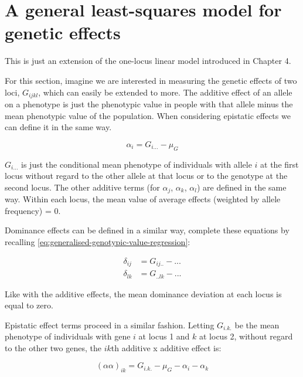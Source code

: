 \documentclass[
]{book}
\begin{document}
\hypertarget{a-general-least-squares-model-for-genetic-effects}{%
\section{A general least-squares model for genetic effects}\label{a-general-least-squares-model-for-genetic-effects}}

This is just an extension of the one-locus linear model introduced in Chapter 4.

For this section, imagine we are interested in measuring the genetic effects of two loci, \(G_{ijkl}\), which can easily be extended to more. The additive effect of an allele on a phenotype is just the phenotypic value in people with that allele minus the mean phenotypic value of the population. When considering epistatic effects we can define it in the same way.

\begin{equation}
  \alpha_{i} = G_{i...} - \mu_{G}
  \label{eq:additive-effects-i}
\end{equation}

\(G_{i...}\) is just the conditional mean phenotype of individuals with allele \(i\) at the first locus without regard to the other allele at that locus or to the genotype at the second locus. The other additive terms (for \(\alpha_{j}\), \(\alpha_{k}\), \(\alpha_{l}\)) are defined in the same way. Within each locus, the mean value of average effects (weighted by allele frequency) = 0.

Dominance effects can be defined in a similar way, complete these equations by recalling \eqref{eq:generalised-genotypic-value-regression}:

\begin{align}
  \delta_{ij} &= G_{ij..} - ... \label{eq:dom-effects-ij} \\
  \delta_{lk} &= G_{..lk} - ... \label{eq:dom-effects-lk}
\end{align}

Like with the additive effects, the mean dominance deviation at each locus is equal to zero.

Epistatic effect terms proceed in a similar fashion. Letting \(G_{i.k.}\) be the mean phenotype of individuals with gene \(i\) at locus 1 and \(k\) at locus 2, without regard to the other two genes, the \(ik\)th additive x additive effect is:

\begin{equation}
  \left(\alpha\alpha\right)_{ik} = G_{i.k.} - \mu_{G} - \alpha_{i} - \alpha_{k} 
  \label{eq:add-add-effects-ik}
\end{equation}
\end{document}
